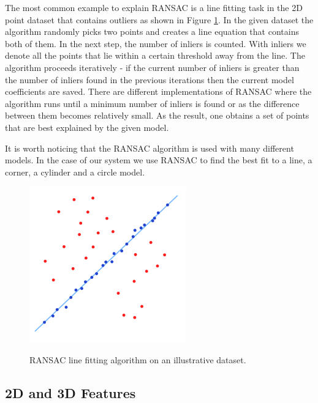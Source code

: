 The most common example to explain RANSAC is a line fitting task in the 2D point dataset that contains outliers as shown in Figure \ref{fig:ransac}. In the given dataset the algorithm randomly picks two points and creates a line equation that contains both of them. In the next step, the number of inliers is counted. With inliers we denote all the points that lie within a certain threshold away from the line. The algorithm proceeds iteratively - if the current number of inliers is greater than the number of inliers found in the previous iterations then the current model coefficients are saved. There are different implementations of RANSAC where the algorithm runs until a minimum number of inliers is found or as the difference between them becomes relatively small. As the result, one obtains a set of points that are best explained by the given model.

It is worth noticing that the RANSAC algorithm is used with many different models. In the case of our system we use RANSAC to find the best fit to a line, a corner, a cylinder and a circle model. 



\begin{figure}
\centering

{\includegraphics[width=0.3\columnwidth]{figures/ransac.png}}

\caption{RANSAC line fitting algorithm on an illustrative dataset.}
\label{fig:ransac}
\end{figure}



\subsection{2D and 3D Features}

